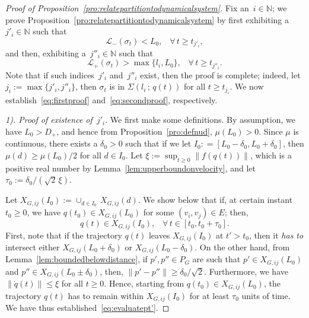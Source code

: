 \documentclass[10pt,twocolumn,twoside]{IEEEtran}
\renewcommand{\cal}{\mathcal}
\renewcommand{\(}{\left (}
\renewcommand{\)}{\right )}
\renewcommand{\;}{\,;\,}
\newcommand{\N}{\mathbb{N}}
\begin{document}
\begin{proof}[Proof of Proposition~\ref{pro:relatepartitiontodynamicalsystem}]
Fix an~$i\in \N$; we prove Proposition~\ref{pro:relatepartitiontodynamicalsystem} by first exhibiting a~$j'_i\in \N$ such that 
\begin{equation}\label{eq:firstproof}
\cal{L}_-(\sigma_t) < L_0, \hspace{10pt} \forall\,  t\ge t_{j'_i}, 
\end{equation}
and then, exhibiting a~$j''_i\in \N$ such that 
\begin{equation}\label{eq:secondproof}
\cal{L}_+(\sigma_t) > \max\{l_i, L_0\},  \hspace{10pt} \forall\, t \ge t_{j''_i}.  
\end{equation}
Note that if such indices~$j'_i$ and~$j''_i$ exist, then the proof is complete; indeed, let $j_i := \max\{j'_i, j''_i\}$, then $\sigma_t$ is in $\Sigma(l_i\; q(t))$ for all $t \ge t_{j_i}$. 
We now establish~\eqref{eq:firstproof} and~\eqref{eq:secondproof}, respectively.

\vspace{3pt}
\noindent
{\it 1). Proof of existence of~$j'_i$}. We first make some definitions. 
By assumption, we have $L_0 > D_+$, 
and hence from Proposition~\ref{pro:defnud}, $\mu(L_0) > 0$. Since $\mu$ is continuous,  there exists a $\delta_0 > 0$ such that if we let $I_0: = [L_0 - \delta_0, L_0+ \delta_0]$, then    
$\mu(d) \ge \mu(L_0)/2$ for all  $d \in I_0$.  
Let $\xi:= \sup_{t \ge 0} \| f(q(t)) \|$, which is a positive real number by Lemma~\ref{lem:upperboundonvelocity}, and let 
$
\tau_0 := {\delta_0} / (\sqrt{2} \, \xi )
$.

Let 
$
X_{G,ij}(I_0) := \cup_{d\in I_0} \, X_{G,ij}(d)
$. 
We show below that if, at certain instant $t_0\ge 0$, we have  $q(t_0)\in X_{G,ij}(L_0)$ for some $(v_i,v_j) \in E$; then,   
\begin{equation}\label{eq:evaluatept'}
q(t) \in X_{G,ij}(I_0), \hspace{10pt} \forall\, t \in  [t_0, t_0 +  \tau_0 ]. 
\end{equation}
First, note that if the trajectory $q(t)$ leaves $X_{G,ij}(I_0)$ at $t' > t_0$, then it {\it has to} intersect either $ X_{G,ij}(L_0 + \delta_0)$ or  $ X_{G,ij}(L_0 - \delta_0)$. 
On the other hand, from Lemma~\ref{lem:boundedbelowdistance}, 
if $p', p''\in P_G$ are such that $p'\in X_{G,ij}(L_0)$ and 
$
p''\in X_{G,ij}(L_0 \pm\delta_0)
$, 
then, 
$
\|p' - p''\| \ge \delta_0/ \sqrt{2}
$.  Furthermore, we have
$\|\dot q(t)\| \le \xi$ for all $t \ge 0$. Hence, starting from $q(t_0)\in X_{G,ij}(L_0)$, the trajectory $q(t)$ has to remain within $X_{G,ij}(I_0)$ for at least $\tau_0$ units of time. We have thus established~\eqref{eq:evaluatept'}. 


\end{proof}
\end{document}
